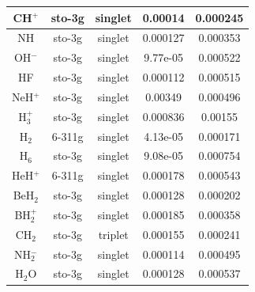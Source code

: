 \documentclass[11pt]{article}
\begin{document}
\begin{table}[htbp]
{\begin{tabular}{|| ccccc ||}
                CH$^+$ & sto-3g & singlet & 0.00014 & 0.000245 \\ [0.5ex] \hline
                NH & sto-3g & singlet & 0.000127 & 0.000353 \\ [0.5ex] \hline
                OH$^-$ & sto-3g & singlet & 9.77e-05 & 0.000522 \\ [0.5ex] \hline
                HF & sto-3g & singlet & 0.000112 & 0.000515 \\ [0.5ex] \hline
                NeH$^+$ & sto-3g & singlet & 0.00349 & 0.000496 \\ [0.5ex] \hline
                H$_3^+$ & sto-3g & singlet & 0.000836 & 0.00155 \\ [0.5ex] \hline
                H$_2$ & 6-311g & singlet & 4.13e-05 & 0.000171 \\ [0.5ex] \hline
                H$_6$ & sto-3g & singlet & 9.08e-05 & 0.000754 \\ [0.5ex] \hline
                HeH$^+$ & 6-311g & singlet & 0.000178 & 0.000543 \\ [0.5ex] \hline
                BeH$_2$ & sto-3g & singlet & 0.000128 & 0.000202 \\ [0.5ex] \hline
                BH$_2^+$ & sto-3g & singlet & 0.000185 & 0.000358 \\ [0.5ex] \hline
                CH$_2$ & sto-3g & triplet & 0.000155 & 0.000241 \\ [0.5ex] \hline
                NH$_2^-$ & sto-3g & singlet & 0.000114 & 0.000495 \\ [0.5ex] \hline
                H$_2$O & sto-3g & singlet & 0.000128 & 0.000537 \\ [0.5ex] \hline
            \end{tabular}
}
\end{table}
\end{document}
